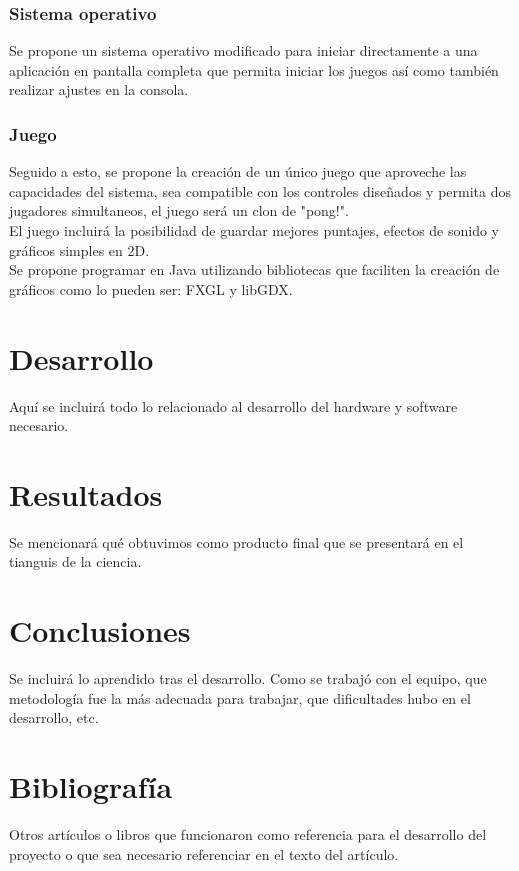 \documentclass[letterpaper]{article}
\begin{document}
\begin{multicols}{2}
\subsubsection{Sistema operativo}
Se propone un sistema operativo modificado para iniciar directamente a una
aplicación en pantalla completa que permita iniciar los juegos así como también
realizar ajustes en la consola.


\subsubsection{Juego}
Seguido a esto, se propone la creación de un único juego que aproveche las
capacidades del sistema, sea compatible con los controles diseñados y permita
dos jugadores simultaneos, el juego será un clon de "pong!".\\
El juego incluirá la posibilidad de guardar mejores puntajes, efectos de sonido
y gráficos simples en 2D.\\
Se propone programar en Java utilizando bibliotecas que faciliten la creación
de gráficos como lo pueden ser: FXGL y libGDX.

\section{Desarrollo}
Aquí se incluirá todo lo relacionado al desarrollo del hardware y software
necesario.

\section{Resultados}
Se mencionará qué obtuvimos como producto final que se presentará en el tianguis
de la ciencia.

\section{Conclusiones}
Se incluirá lo aprendido tras el desarrollo. Como se trabajó con el equipo, que
metodología fue la más adecuada para trabajar, que dificultades hubo en el
desarrollo, etc.

\section{Bibliografía}
Otros artículos o libros que funcionaron como referencia para el desarrollo del
proyecto o que sea necesario referenciar en el texto del artículo.

\end{multicols}
\end{document}
